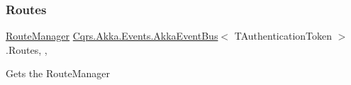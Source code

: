 \subsubsection{\texorpdfstring{Routes}{Routes}}
{\footnotesize\ttfamily \hyperlink{classCqrs_1_1Bus_1_1RouteManager}{Route\+Manager} \hyperlink{classCqrs_1_1Akka_1_1Events_1_1AkkaEventBus}{Cqrs.\+Akka.\+Events.\+Akka\+Event\+Bus}$<$ T\+Authentication\+Token $>$.Routes\hspace{0.3cm}{\ttfamily [static]}, {\ttfamily [get]}, {\ttfamily [protected]}}



Gets the Route\+Manager 

